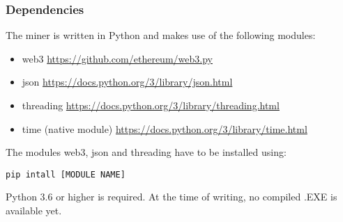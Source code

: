 \documentclass{article}
\begin{document}
\subsubsection{Dependencies}
The miner is written in Python and makes use of the following modules:
\begin{itemize}
    \item web3 \url{https://github.com/ethereum/web3.py}
    \item json \url{https://docs.python.org/3/library/json.html}
    \item threading \url{https://docs.python.org/3/library/threading.html}
    \item time (native module) \url{https://docs.python.org/3/library/time.html}
\end{itemize}

The modules web3, json and threading have to be installed using:
\begin{verbatim}
pip intall [MODULE NAME]    
\end{verbatim}
Python 3.6 or higher is required. At the time of writing, no compiled .EXE is available yet.
\end{document}
